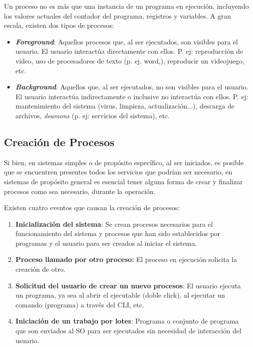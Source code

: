 \documentclass[12pt, a4paper]{article} %
\begin{document}
Un proceso no es más que una instancia de un programa en ejecución, incluyendo los valores actuales del contador del programa, registros y variables. A gran escala, existen dos tipos de procesos:

\begin{itemize}
	\item \textbf{\textit{Foreground}}: Aquellos procesos que, al ser ejecutados, son visibles para el usuario. El usuario interactúa directamente con ellos. P. ej: reproducción de video, uso de procesadores de texto (p. ej. word,), reproducir un videojuego, etc.
	\item \textbf{\textit{Background}}: Aquellos que, al ser ejecutados, no son visibles para el usuario. El usuario interactúa indirectamente o inclusive no interactúa con ellos. P. ej: mantenimiento del sistema (virus, limpieza, actualización...), descarga de archivos, \textit{deamons} (p. ej: servicios del sistema), etc.
\end{itemize}

\subsection{Creación de Procesos}

Si bien, en sistemas simples o de propósito específico, al ser iniciados, es posible que se encuentren presentes todos los servicios que podrían ser necesario, en sistemas de propósito general es esencial tener alguna forma de crear y finalizar procesos como sea necesario, durante la operación.

Existen cuatro eventos que causan la creación de procesos:

\begin{enumerate}
	\item \textbf{Inicialización del sistema}: Se crean procesos necesarios para el funcionamiento del sistema y procesos que han sido establecidos por programas y el usuario para ser creados al iniciar el sistema.
	\item \textbf{Proceso llamado por otro proceso:} El proceso en ejecución solicita la creación de otro.
	\item \textbf{Solicitud del usuario de crear un nuevo procesos}: El usuario ejecuta un programa, ya sea al abrir el ejecutable (doble click), al ejecutar un comando (programa) a través del CLI, etc.
	\item \textbf{Iniciación de un trabajo por lotes}: Programa o conjunto de programa que son enviados al SO para ser ejecutados sin necesidad de interacción del usuario.
\end{enumerate}
\end{document}
